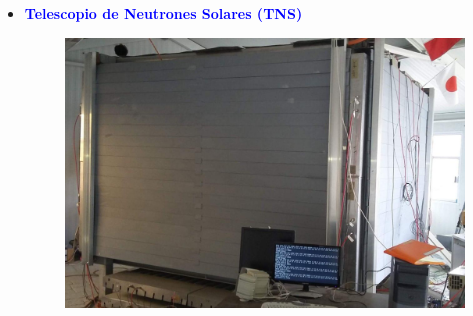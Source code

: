 \begin{frame}{}
\begin{columns}
\begin{column}{0.5\textwidth}
\begin{itemize}
                     \item \textcolor{blue}{\textbf{Telescopio de Neutrones Solares (TNS)}}
                     \begin{figure}
                         \centering
                         \includegraphics[width=0.61\linewidth]{Figures/tns_new2.jpeg}
                     \end{figure}                     
                \end{itemize}
            \end{column}            
        \end{columns}        

    \end{frame}